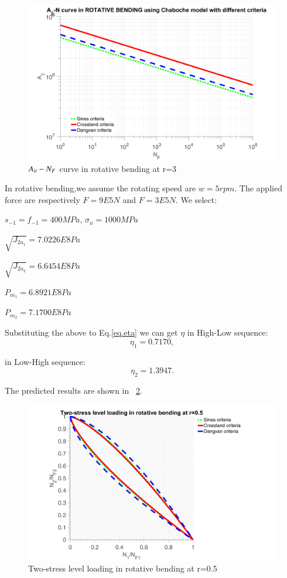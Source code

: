 \documentclass[3p,times,procedia,number]{elsarticle}
\newcommand{\figref}[1]{\figurename~\ref{#1}}
\begin{document}
\begin{figure}[h!]
	\centering
	\includegraphics[width=\textwidth]{figures//JNRB.png} 
	\caption{$A_{\uppercase\expandafter{\romannumeral2}}-N_F$ curve in rotative bending at r=3}
	\label{JNRB}
\end{figure}

In rotative bending,we assume the rotating speed are $w=5rpm$. The applied force are respectively $F=9E5 N$ and $F=3E5 N$. We select:

$s_{-1}=f_{-1}=400MPa$, $\sigma_{u}=1000MPa$

\vspace{6pt}
$\sqrt{J_{2a_1}}=7.0226E8 Pa$

\vspace{6pt}
$\sqrt{J_{2a_2}}=6.6454E8 Pa$

\vspace{6pt}
$P_{m_1}=6.8921E8 Pa$

\vspace{6pt}
$P_{m_2}=7.1700E8 Pa$

Substituting the above to Eq.\eqref{eq.eta} we can get $\eta$ in High-Low sequence:
$$\eta_1=0.7170,$$

in Low-High sequence:
$$\eta_2=1.3947.$$

The predicted results are shown in \figref{2stressRB}.

\begin{figure}[h!]
	\centering
	\includegraphics[width=\textwidth]{figures//2stressRB.png} 
	\caption{Two-stress level loading in rotative bending at r=0.5}
	\label{2stressRB}
\end{figure}
\clearpage
\end{document}
